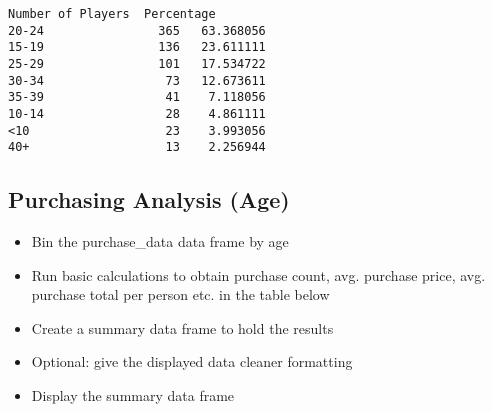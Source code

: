\documentclass[11pt]{article}
\makeatletter
\newcommand{\boxspacing}{\kern\kvtcb@left@rule\kern\kvtcb@boxsep}
\newcommand{\prompt}[4]{
        {\ttfamily\llap{{\color{#2}[#3]:\hspace{3pt}#4}}\vspace{-\baselineskip}}
    }
\makeatother
\begin{document}
            \begin{tcolorbox}[breakable, size=fbox, boxrule=.5pt, pad at break*=1mm, opacityfill=0]
\prompt{Out}{outcolor}{108}{\boxspacing}
\begin{Verbatim}[commandchars=\\\{\}]
       Number of Players  Percentage
20-24                365   63.368056
15-19                136   23.611111
25-29                101   17.534722
30-34                 73   12.673611
35-39                 41    7.118056
10-14                 28    4.861111
<10                   23    3.993056
40+                   13    2.256944
\end{Verbatim}
\end{tcolorbox}
        
    \hypertarget{purchasing-analysis-age}{%
\subsection{Purchasing Analysis (Age)}\label{purchasing-analysis-age}}

    \begin{itemize}
\item
  Bin the purchase\_data data frame by age
\item
  Run basic calculations to obtain purchase count, avg. purchase price,
  avg. purchase total per person etc. in the table below
\item
  Create a summary data frame to hold the results
\item
  Optional: give the displayed data cleaner formatting
\item
  Display the summary data frame
\end{itemize}
\end{document}

